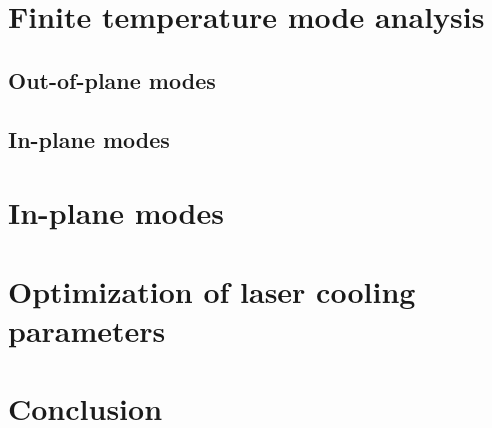 \documentclass[aps, pra, twocolumn]{revtex4-1}
\begin{document}
\section{Finite temperature mode analysis}

\subsection{Out-of-plane modes}

\subsection{In-plane modes}


\section{In-plane modes}
\label{sec:inplanemodes}


\section{Optimization of laser cooling parameters}
\label{sec:optimization}


\section{Conclusion}
\label{sec:conclusion}


\end{document}
